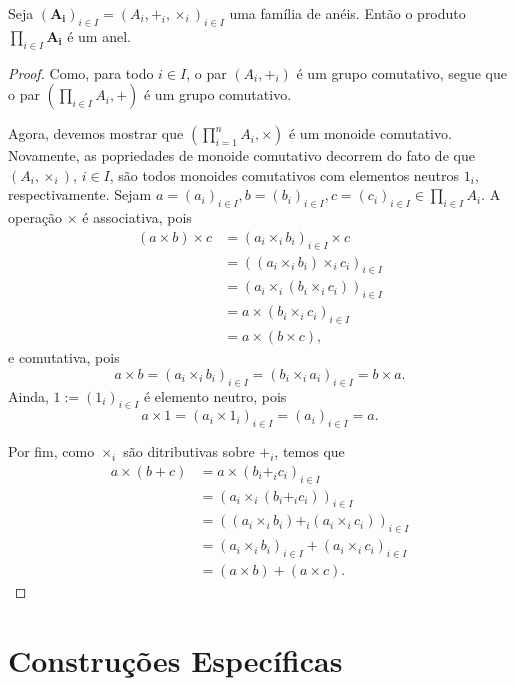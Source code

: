 \begin{prop}
Seja $(\bm{A_i})_{i \in I}=(A_i,+_i,\times_i)_{i \in I}$ uma família de anéis. Então o produto $\prod_{i \in I}\bm{A_i}$ é um anel.
\end{prop}
\begin{proof}
Como,  para todo $i \in I$, o par $(A_i,+_i)$ é um grupo comutativo, segue que o par $\left(\prod_{i \in I} A_i,+ \right)$ é um grupo comutativo.

Agora, devemos mostrar que $\left( \prod_{i=1}^n A_i,\times \right)$ é um monoide comutativo. Novamente, as popriedades de monoide comutativo decorrem do fato de que $(A_i,\times_i)$, $i \in I$, são todos monoides comutativos com elementos neutros $1_i$, respectivamente. Sejam $a=(a_i)_{i \in I}, b=(b_i)_{i \in I}, c=(c_i)_{i \in I} \in \prod_{i \in I} A_i$. A operação $\times$ é associativa, pois
	\begin{align*}
	(a \times b) \times c &= (a_i \times_i b_i)_{i \in I} \times c \\
		&= ((a_i \times_i b_i) \times_i c_i)_{i \in I} \\
		&= (a_i \times_i (b_i \times_i c_i))_{i \in I} \\
		&= a \times (b_i \times_i c_i)_{i \in I} \\
		&= a \times (b \times c),
	\end{align*}
e comutativa, pois
	\begin{equation*}
	a \times b = (a_i \times_i b_i)_{i \in I} = (b_i \times_i a_i)_{i \in I} = b \times a.
	\end{equation*}
Ainda, $1 := (1_i)_{i \in I}$ é elemento neutro, pois
	\begin{equation*}
	a \times 1 = (a_i \times 1_i)_{i \in I} = (a_i)_{i \in I} = a.
	\end{equation*}

	Por fim, como $\times_i$ são ditributivas sobre $+_i$, temos que
	\begin{align*}
	a \times (b + c) &= a \times (b_i +_i c_i)_{i \in I} \\
		&= (a_i \times_i (b_i +_i c_i))_{i \in I} \\
		&= ((a_i \times_i b_i) +_i (a_i \times_i c_i))_{i \in I} \\
		&= (a_i \times_i b_i)_{i \in I} + (a_i \times_i c_i)_{i \in I} \\
		&= (a \times b) + (a \times c).
	\end{align*}
\end{proof}

\section{Construções Específicas}

